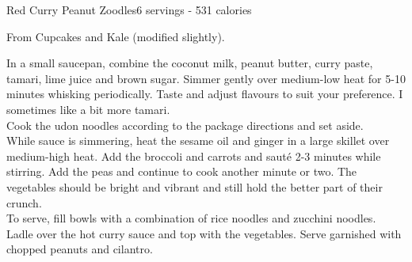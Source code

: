 \begin{recipe}{Red Curry Peanut Zoodles}{6 servings - 531 calories}{}

\freeform From Cupcakes and Kale (modified slightly).


In a small saucepan, combine the coconut milk, peanut butter, curry paste, tamari, lime juice and brown sugar. Simmer gently over medium-low heat for 5-10 minutes whisking periodically. Taste and adjust flavours to suit your preference. I sometimes like a bit more tamari.\\

Cook the udon noodles according to the package directions and set aside.\\

While sauce is simmering, heat the sesame oil and ginger in a large skillet over medium-high heat. Add the broccoli and carrots and sauté 2-3 minutes while stirring. Add the peas and continue to cook another minute or two. The vegetables should be bright and vibrant and still hold the better part of their crunch.\\

To serve, fill bowls with a combination of rice noodles and zucchini noodles. Ladle over the hot curry sauce and top with the vegetables. Serve garnished with chopped peanuts and cilantro.

\end{recipe}